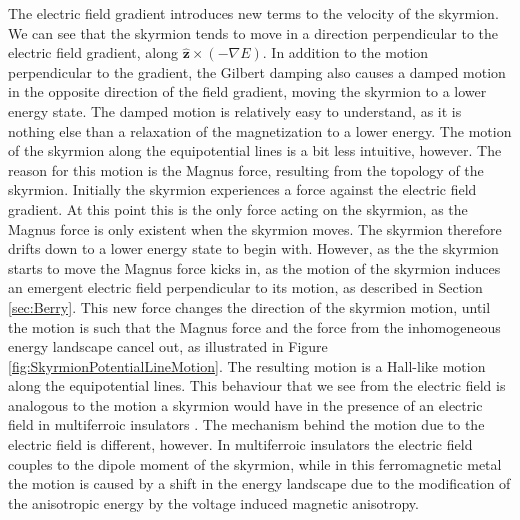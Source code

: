 The electric field gradient introduces new terms to the velocity of the skyrmion. We can see that the skyrmion tends to move in a direction perpendicular to the electric field gradient, along $\mathbold{\hat{z}}\times(-\nabla E)$. In addition to the motion perpendicular to the gradient, the Gilbert damping also causes a damped motion in the opposite direction of the field gradient, moving the skyrmion to a lower energy state. The damped motion is relatively easy to understand, as it is nothing else than a relaxation of the magnetization to a lower energy. The motion of the skyrmion along the equipotential lines is a bit less intuitive, however. The reason for this motion is the Magnus force, resulting from the topology of the skyrmion. Initially the skyrmion experiences a force against the electric field gradient. At this point this is the only force acting on the skyrmion, as the Magnus force is only existent when the skyrmion moves. The skyrmion therefore drifts down to a lower energy state to begin with. However, as the the skyrmion starts to move the Magnus force kicks in, as the motion of the skyrmion induces an emergent electric field perpendicular to its motion, as described in Section \ref{sec:Berry}. This new force changes the direction of the skyrmion motion, until the motion is such that the Magnus force and the force from the inhomogeneous energy landscape cancel out, as illustrated in Figure \ref{fig:SkyrmionPotentialLineMotion}. The resulting motion is a Hall-like motion along the equipotential lines. This behaviour that we see from the electric field is analogous to the motion a skyrmion would have in the presence of an electric field in multiferroic insulators \cite{Liu2013}. The mechanism behind the motion due to the electric field is different, however. In multiferroic insulators the electric field couples to the dipole moment of the skyrmion, while in this ferromagnetic metal the motion is caused by a shift in the energy landscape due to the modification of the anisotropic energy by the voltage induced magnetic anisotropy. 

